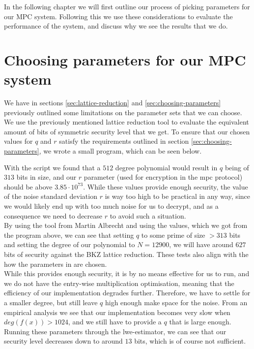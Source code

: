 \documentclass[../main.tex]{subfiles}
\begin{document}
In the following chapter we will first outline our process of picking parameters for our MPC system. Following this we use these considerations to evaluate the performance of the system, and discuss why we see the results that we do.

\section{Choosing parameters for our MPC system}
We have in sections \ref{sec:lattice-reduction} and \ref{sec:choosing-parameters} previously outlined some limitations on the parameter sets that we can choose. We use the previously mentioned lattice reduction tool to evaluate the equivalent amount of bits of symmetric security level that we get. To ensure that our chosen values for $q$ and $r$ satisfy the requirements outlined in section \ref{sec:choosing-parameters}, we wrote a small program, which can be seen below.
    
	With the script we found that a $512$ degree polynomial would result in $q$ being of $313$ bits in size, and our $r$ parameter (used for encryption in the mpc protocol) should be above $3.85 \cdot 10^{73}$.
	While these values provide enough security, the value of the noise standard deviation $r$ is way too high to be
	practical in any way, since we would likely end up with too much noise for us to decrypt, and as a consequence we need to decrease $r$ to avoid such a situation.
	\\[5mm]
    By using the tool from Martin Albrecht %
    and using the values, which we got from the program above, we can see that setting $q$ to some prime
    of size $> 313$ bits and setting the degree of our polynomial to $N = 12900$, we will have around $627$ bits
    of security against the BKZ lattice reduction.
    These tests also align with the how the parameters in \cite{damgaard2012multiparty} are chosen.
    \\[5mm]
    While this provides enough security, it is by no means effective for us to run, and we do not have the entry-wise multiplication optimisation, meaning that the efficiency of our implementation degrades further. %
    Therefore, we have to settle for a smaller degree, but still leave $q$ high enough make space for the noise.
    From an empirical analysis we see that our implementation becomes very slow when $deg(f(x)) > 1024$, and we still have to provide a $q$ that is large enough.
    Running these parameters through the lwe-estimator, we can see that our security level decreases
    down to around $13$ bits, which is of course not sufficient. %
\end{document}
